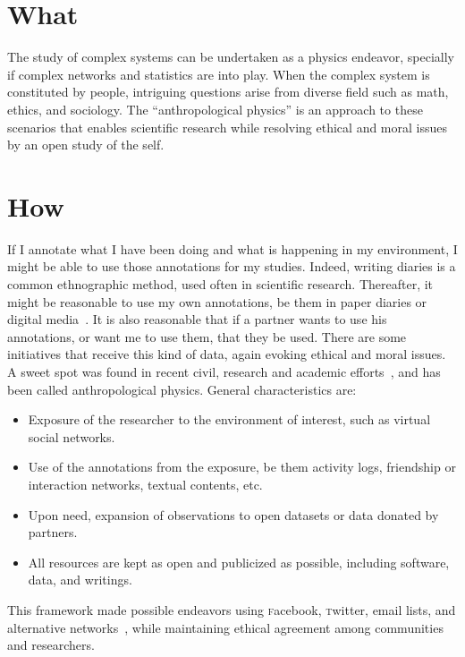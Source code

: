 \documentclass[a4paper, 11pt]{article} %
\newcommand{\twitter}{\textsc{t}witter}
\newcommand{\facebook}{\textsc{f}acebook}
\begin{document}
\section*{What}
The study of complex systems can be undertaken as a physics endeavor, specially if complex networks and statistics are into play.
When the complex system is constituted by people, intriguing questions arise from diverse field such as math, ethics, and sociology. The ``anthropological physics'' is an approach to these scenarios that enables scientific research while resolving ethical and moral issues by an open study of the self.

\section*{How}
If I annotate what I have been doing and what is happening in my environment, I might be able to use those annotations for my studies.
Indeed, writing diaries is a common ethnographic method, used often in scientific research. Thereafter, it might be reasonable
to use my own annotations, be them in paper diaries or digital media~\cite{wolfram}. It is also reasonable that if a partner wants to use his annotations, or want me to use them, that they be used. There are some initiatives that receive this kind of data, again evoking ethical and moral issues. A sweet spot was found in recent civil, research and academic efforts~\cite{pnud5,ensaio}, and has been called anthropological physics. General characteristics are:

\begin{itemize}
    \item Exposure of the researcher to the environment of interest, such as virtual social networks.
    \item Use of the annotations from the exposure, be them activity logs, friendship or interaction networks, textual contents, etc.
    \item Upon need, expansion of observations to open datasets or data donated by partners.
    \item All resources are kept as open and publicized as possible, including software, data, and writings.
\end{itemize}

This framework made possible endeavors using \facebook, \twitter, email lists, and alternative networks~\cite{ars,ocupagov,stabNet,textNet,pnud5}, while maintaining ethical agreement among communities and researchers.
\end{document}
